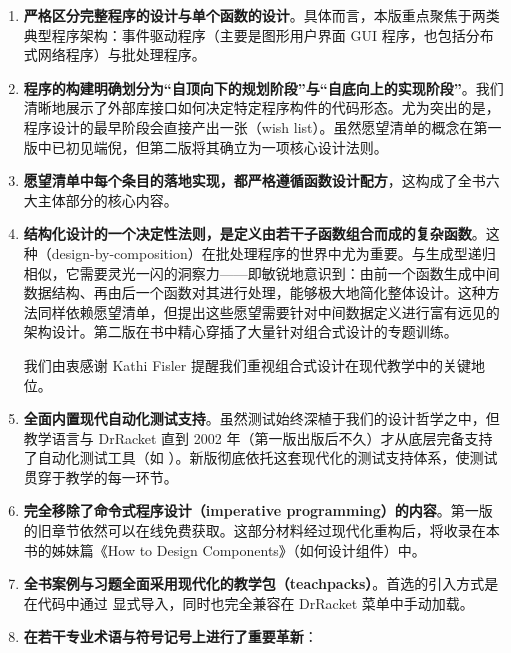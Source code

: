 \begin{enumerate}
  \item \textbf{严格区分完整程序的设计与单个函数的设计}。具体而言，本版重点聚焦于两类典型程序架构：事件驱动程序（主要是图形用户界面 GUI 程序，也包括分布式网络程序）与批处理程序。
  
  \item \textbf{程序的构建明确划分为“自顶向下的规划阶段”与“自底向上的实现阶段”}。我们清晰地展示了外部库接口如何决定特定程序构件的代码形态。尤为突出的是，程序设计的最早阶段会直接产出一张（wish list）。虽然愿望清单的概念在第一版中已初见端倪，但第二版将其确立为一项核心设计法则。
  
  \item \textbf{愿望清单中每个条目的落地实现，都严格遵循函数设计配方}，这构成了全书六大主体部分的核心内容。
  
  \item \textbf{结构化设计的一个决定性法则，是定义由若干子函数组合而成的复杂函数}。这种（design-by-composition）在批处理程序的世界中尤为重要。与生成型递归相似，它需要灵光一闪的洞察力——即敏锐地意识到：由前一个函数生成中间数据结构、再由后一个函数对其进行处理，能够极大地简化整体设计。这种方法同样依赖愿望清单，但提出这些愿望需要针对中间数据定义进行富有远见的架构设计。第二版在书中精心穿插了大量针对组合式设计的专题训练。
  
  \begin{notebox}[致意]
  我们由衷感谢 Kathi Fisler 提醒我们重视组合式设计在现代教学中的关键地位。
  \end{notebox}
  
  \item \textbf{全面内置现代自动化测试支持}。虽然测试始终深植于我们的设计哲学之中，但教学语言与 DrRacket 直到 2002 年（第一版出版后不久）才从底层完备支持了自动化测试工具（如 ）。新版彻底依托这套现代化的测试支持体系，使测试贯穿于教学的每一环节。
  
  \item \textbf{完全移除了命令式程序设计（imperative programming）的内容}。第一版的旧章节依然可以在线免费获取。这部分材料经过现代化重构后，将收录在本书的姊妹篇《How to Design Components》（如何设计组件）中。
  
  \item \textbf{全书案例与习题全面采用现代化的教学包（teachpacks）}。首选的引入方式是在代码中通过  显式导入，同时也完全兼容在 DrRacket 菜单中手动加载。
  
  \item \textbf{在若干专业术语与符号记号上进行了重要革新}：
  

\end{enumerate}

